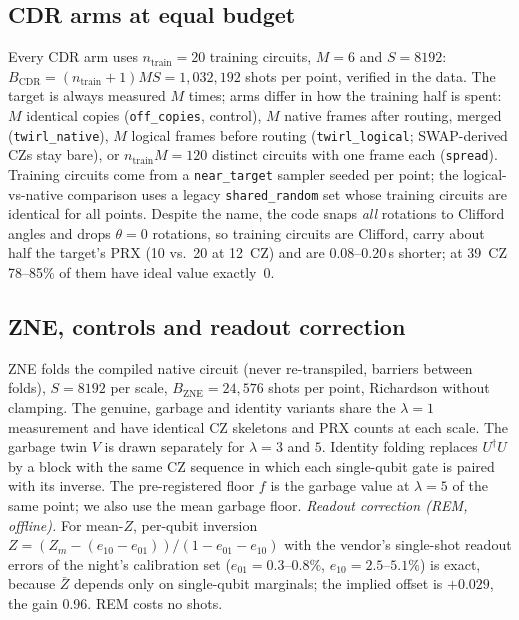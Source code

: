 \documentclass[conference]{IEEEtran}
\newcommand{\arm}[1]{\texttt{#1}}
\begin{document}
\subsection{CDR arms at equal budget}
Every CDR arm uses $n_{\text{train}}=20$ training circuits, $M=6$ and $S=8192$:
$B_{\text{CDR}}=(n_{\text{train}}+1)MS=1{,}032{,}192$ shots per point, verified in the data.
The target is always measured $M$ times; arms differ in how the training half is spent: $M$
identical copies (\arm{off\_copies}, control), $M$ native frames after routing, merged
(\arm{twirl\_native}), $M$ logical frames before routing (\arm{twirl\_logical}; SWAP-derived
CZs stay bare), or $n_{\text{train}}M=120$ distinct circuits with one frame each
(\arm{spread}). Training circuits come from a \arm{near\_target} sampler seeded per point; the
logical-vs-native comparison uses a legacy \arm{shared\_random} set whose training circuits
are identical for all points. Despite the name, the code snaps \emph{all} rotations to Clifford
angles and drops $\theta=0$ rotations, so training circuits are Clifford, carry about half the
target's PRX (10 vs.\ 20 at 12~CZ) and are 0.08--0.20\,\textmu s shorter; at 39~CZ 78--85\% of them
have ideal value exactly~0.

\subsection{ZNE, controls and readout correction}
ZNE folds the compiled native circuit (never re-transpiled, barriers between folds),
$S=8192$ per scale, $B_{\text{ZNE}}=24{,}576$ shots per point, Richardson without clamping.
The genuine, garbage and identity variants share the $\lambda=1$ measurement and have identical
CZ skeletons and PRX counts at each scale. The garbage twin $V$ is drawn separately for
$\lambda=3$ and $5$. Identity folding replaces $U^\dagger U$ by a block with the same CZ
sequence in which each single-qubit gate is paired with its inverse. The pre-registered floor
$f$ is the garbage value at $\lambda=5$ of the same point; we also use the mean garbage floor.
\emph{Readout correction (REM, offline).} For mean-$Z$, per-qubit inversion
$Z=(Z_m-(e_{10}-e_{01}))/(1-e_{01}-e_{10})$ with the vendor's single-shot readout errors of the
night's calibration set ($e_{01}=0.3$--$0.8\%$, $e_{10}=2.5$--$5.1\%$) is exact, because
$\bar Z$ depends only on single-qubit marginals; the implied offset is $+0.029$, the gain
0.96. REM costs no shots.
\end{document}
